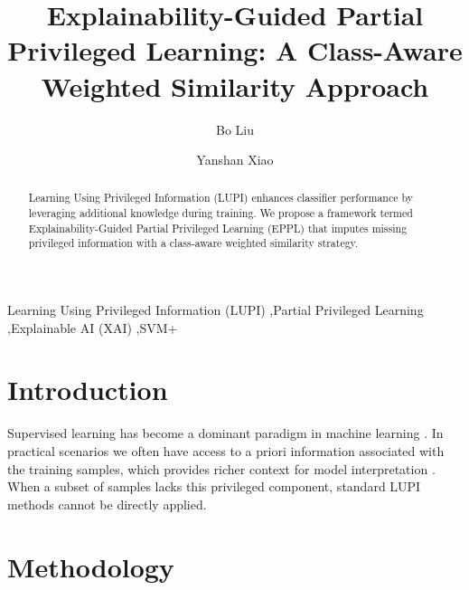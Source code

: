 \documentclass[a4paper,fleqn]{cas-sc}
\begin{document}
\title [mode = title]{Explainability-Guided Partial Privileged Learning: A Class-Aware Weighted Similarity Approach}
\shorttitle{}
\shortauthors{}

\author[a]{Bo Liu}\cormark[1]
\author[b]{Yanshan Xiao}


\fntext[1]{}

\begin{keywords}
    Learning Using Privileged Information (LUPI) \sep Partial Privileged Learning \sep Explainable AI (XAI) \sep SVM+
\end{keywords}

\maketitle

\begin{abstract}
Learning Using Privileged Information (LUPI) enhances classifier performance by
leveraging additional knowledge during training. We propose a framework termed
Explainability-Guided Partial Privileged Learning (EPPL) that imputes missing
privileged information with a class-aware weighted similarity strategy.
\end{abstract}

\section{Introduction}\label{introduction}

Supervised learning has become a dominant paradigm in machine learning \cite{vapnik2009new}.
In practical scenarios we often have access to a priori information associated
with the training samples, which provides richer context for model
interpretation \cite{li2018r}. When a subset of samples lacks this privileged
component, standard LUPI methods cannot be directly applied.

\section{Methodology}\label{sec:methodology}
\end{document}
